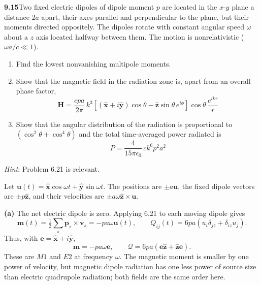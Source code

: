\par\bigskip
\noindent\textbf{9.15}\quad Two fixed electric dipoles of dipole moment $p$ are located in the $x$-$y$ plane a distance $2a$ apart, their axes parallel and perpendicular to the plane, but their moments directed oppositely. The dipoles rotate with constant angular speed $\omega$ about a $z$ axis located halfway between them. The motion is nonrelativistic ($\omega a/c\ll1$).
\begin{enumerate}
\item[(a)] Find the lowest nonvanishing multipole moments.
\item[(b)] Show that the magnetic field in the radiation zone is, apart from an overall phase factor,
\[
\mathbf{H}=\frac{cpa}{2\pi}\,k^{3}[(\hat{\mathbf{x}}+i\hat{\mathbf{y}})\cos\theta-\hat{\mathbf{z}}\sin\theta\,e^{i\phi}]\cos\theta\,\frac{e^{ikr}}{r}
\]
\item[(c)] Show that the angular distribution of the radiation is proportional to $(\cos^{2}\theta+\cos^{4}\theta)$ and the total time-averaged power radiated is
\[
P=\frac{4}{15\pi\epsilon_{0}}\,ck^{6}p^{2}a^{2}
\]
\end{enumerate}
\emph{Hint}: Problem 6.21 is relevant.
\solution

Let $\mathbf u(t)=\hat{\mathbf x}\cos\omega t+
\hat{\mathbf y}\sin\omega t$. The positions are $\pm a\mathbf u$,
the fixed dipole vectors are $\pm p\hat{\mathbf z}$, and their velocities
are $\pm a\omega\hat{\mathbf z}\times\mathbf u$.

\textbf{(a)} The net electric dipole is zero. Applying 6.21 to each
moving dipole gives
\[
\mathbf m(t)=\tfrac12\sum_s\mathbf p_s\times\mathbf v_s
=-pa\omega\mathbf u(t),\qquad
Q_{ij}(t)=6pa(u_i\delta_{jz}+\delta_{iz}u_j).
\]
Thus, with $\mathbf e=\hat{\mathbf x}+i\hat{\mathbf y}$,
\[
\boxed{\mathbf m=-pa\omega\mathbf e,\qquad
\mathcal Q=6pa(\mathbf e\hat{\mathbf z}+\hat{\mathbf z}\mathbf e).}
\]
These are $M1$ and $E2$ at frequency $\omega$. The magnetic moment is
smaller by one power of velocity, but magnetic dipole radiation has one
less power of source size than electric quadrupole radiation; both fields
are the same order here.

